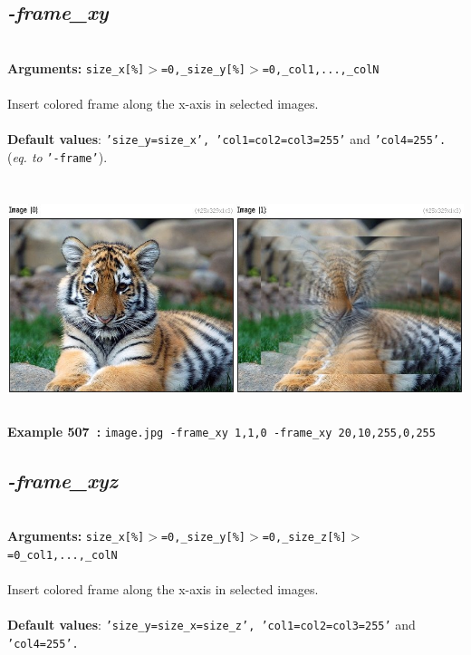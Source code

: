 \documentclass[a4paper,11pt,twoside]{book}
\begin{document}
\subsection{\emph{-frame\_xy} }\vspace*{-0.5em}
~\\\textbf{Arguments: } 
{\small \texttt{size\_x[\%]$>$=0,\_size\_y[\%]$>$=0,\_col1,...,\_colN}}\\~\\
Insert colored frame along the x-axis in selected images.
~\\~\\\textbf{Default values}: {\small \texttt{'size\_y=size\_x', 'col1=col2=col3=255'} and \texttt{'col4=255'.}}
~\\(\emph{eq. to} {\small \texttt{'-frame'}}).
\begin{center}\includegraphics[keepaspectratio=true,height=7cm,width=\textwidth]{img/gmic_def507.jpg}\\
{\footnotesize \textbf{Example 507~:} \texttt{image.jpg -frame\_xy 1,1,0 -frame\_xy 20,10,255,0,255}}
\end{center}

\subsection{\emph{-frame\_xyz} }\vspace*{-0.5em}
~\\\textbf{Arguments: } 
{\small \texttt{size\_x[\%]$>$=0,\_size\_y[\%]$>$=0,\_size\_z[\%]$>$=0\_col1,...,\_colN}}\\~\\
Insert colored frame along the x-axis in selected images.
~\\~\\\textbf{Default values}: {\small \texttt{'size\_y=size\_x=size\_z', 'col1=col2=col3=255'} and \texttt{'col4=255'.}}
\end{document}
